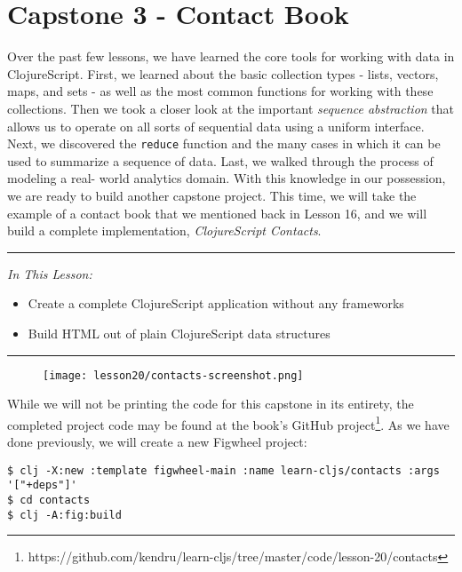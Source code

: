 \documentclass[10pt,twoside,openright]{memoir}
\begin{document}
\chapter{Capstone 3 - Contact Book}

Over the past few lessons, we have learned the core tools for working
with data in ClojureScript. First, we learned about the basic collection
types - lists, vectors, maps, and sets - as well as the most common
functions for working with these collections. Then we took a closer look
at the important \emph{sequence abstraction} that allows us to operate
on all sorts of sequential data using a uniform interface. Next, we
discovered the \texttt{reduce} function and the many cases in which it
can be used to summarize a sequence of data. Last, we walked through the
process of modeling a real- world analytics domain. With this knowledge
in our possession, we are ready to build another capstone project. This
time, we will take the example of a contact book that we mentioned back
in Lesson 16, and we will build a complete implementation,
\emph{ClojureScript Contacts}.

\begin{center}\rule{0.5\linewidth}{0.5pt}\end{center}

\emph{In This Lesson:}

\begin{itemize}
\tightlist
\item
  Create a complete ClojureScript application without any frameworks
\item
  Build HTML out of plain ClojureScript data structures
\end{itemize}

\begin{center}\rule{0.5\linewidth}{0.5pt}\end{center}

\begin{figure}[H]
\centering
\texttt{[image: lesson20/contacts-screenshot.png]}
\end{figure}


While we will not be printing the code for this capstone in its entirety, the completed project code may be found at the book's GitHub project\footnote{https://github.com/kendru/learn-cljs/tree/master/code/lesson-20/contacts}. As we have done previously, we will create a new Figwheel project:

\begin{verbatim}
$ clj -X:new :template figwheel-main :name learn-cljs/contacts :args '["+deps"]'
$ cd contacts
$ clj -A:fig:build
\end{verbatim}
\end{document}

